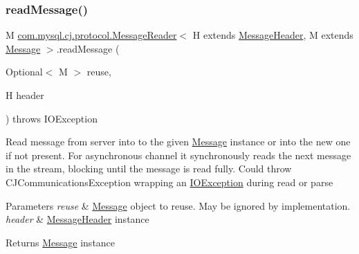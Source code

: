 \mbox{\label{interfacecom_1_1mysql_1_1cj_1_1protocol_1_1_message_reader_a39c99a7fe62d037d0f8d96189ba438ba}} 
\subsubsection{\texorpdfstring{read\+Message()}{readMessage()}\hspace{0.1cm}{\footnotesize\ttfamily [1/2]}}
{\footnotesize\ttfamily M \mbox{\hyperlink{interfacecom_1_1mysql_1_1cj_1_1protocol_1_1_message_reader}{com.\+mysql.\+cj.\+protocol.\+Message\+Reader}}$<$ H extends \mbox{\hyperlink{interfacecom_1_1mysql_1_1cj_1_1protocol_1_1_message_header}{Message\+Header}}, M extends \mbox{\hyperlink{interfacecom_1_1mysql_1_1cj_1_1protocol_1_1_message}{Message}} $>$.read\+Message (\begin{DoxyParamCaption}\item[{Optional$<$ M $>$}]{reuse,  }\item[{H}]{header }\end{DoxyParamCaption}) throws I\+O\+Exception}

Read message from server into to the given \mbox{\hyperlink{interfacecom_1_1mysql_1_1cj_1_1protocol_1_1_message}{Message}} instance or into the new one if not present. For asynchronous channel it synchronously reads the next message in the stream, blocking until the message is read fully. Could throw C\+J\+Communications\+Exception wrapping an \mbox{\hyperlink{}{I\+O\+Exception}} during read or parse


\begin{DoxyParams}{Parameters}
{\em reuse} & \mbox{\hyperlink{interfacecom_1_1mysql_1_1cj_1_1protocol_1_1_message}{Message}} object to reuse. May be ignored by implementation. \\
\hline
{\em header} & \mbox{\hyperlink{interfacecom_1_1mysql_1_1cj_1_1protocol_1_1_message_header}{Message\+Header}} instance \\
\hline
\end{DoxyParams}
\begin{DoxyReturn}{Returns}
\mbox{\hyperlink{interfacecom_1_1mysql_1_1cj_1_1protocol_1_1_message}{Message}} instance 
\end{DoxyReturn}

